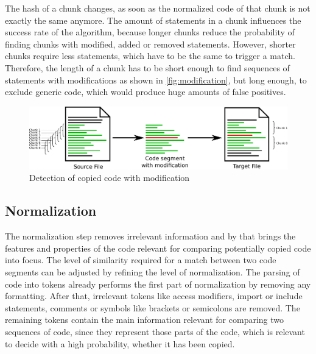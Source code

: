 The hash of a chunk changes, as soon as the normalized code of that chunk is not exactly the same anymore. 
The amount of statements in a chunk influences the success rate of the algorithm, because longer chunks reduce the probability of finding chunks with modified, added or removed statements.
However, shorter chunks require less statements, which have to be the same to trigger a match.
Therefore, the length of a chunk has to be short enough to find sequences of statements with modifications as shown in \autoref{fig:modification}, but long enough, to exclude generic code, which would produce huge amounts of false positives.

\begin{figure}[h]
	\centering
	\includegraphics[width=\linewidth]{figures/modification.pdf}
	\caption{Detection of copied code with modification}\label{fig:modification}
\end{figure}

\subsection{Normalization}\label{section:approach/creating_index/normalization}
The normalization step removes irrelevant information and by that brings the features and properties of the code relevant for comparing potentially copied code into focus.
The level of similarity required for a match between two code segments can be adjusted by refining the level of normalization.
The parsing of code into tokens already performs the first part of normalization by removing any formatting.
After that, irrelevant tokens like access modifiers, import or include statements, comments or symbols like brackets or semicolons are removed.
The remaining tokens contain the main information relevant for comparing two sequences of code, since they represent those parts of the code, which is relevant to decide with a high probability, whether it has been copied.

